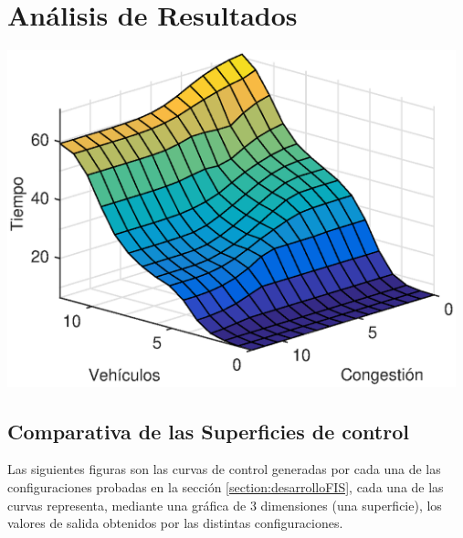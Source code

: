 \chapter{Análisis de Resultados}

\begin{center}
	\includegraphics[width=13cm]{Surfaces/surface_d.eps}
	\label{fig:surfaceControl}
\end{center}

\section{Comparativa de las Superficies de control}
Las siguientes figuras son las curvas de control generadas por cada una de las configuraciones probadas en la sección \ref{section:desarrolloFIS}, cada una de las curvas representa, mediante una gráfica de 3 dimensiones (una superficie), los valores de salida obtenidos por las distintas configuraciones.

